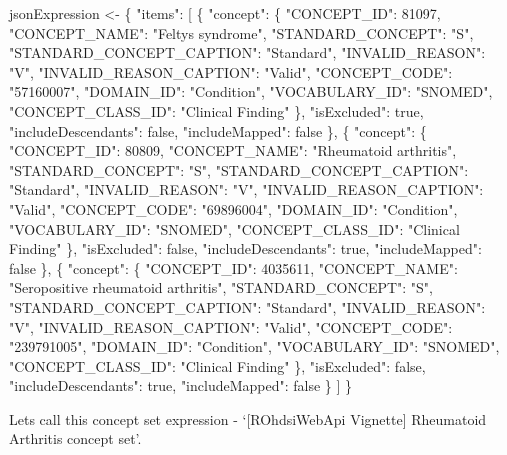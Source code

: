 \documentclass[
]{article}
\newenvironment{Shaded}{\begin{snugshade}}{\end{snugshade}}
\newcommand{\NormalTok}[1]{#1}
\newcommand{\StringTok}[1]{\textcolor[rgb]{0.31,0.60,0.02}{#1}}
\begin{document}
\begin{Shaded}
\begin{Highlighting}[]
\NormalTok{jsonExpression <{-}}\StringTok{ \textquotesingle{}\{}
\StringTok{  "items": [}
\StringTok{    \{}
\StringTok{      "concept": \{}
\StringTok{        "CONCEPT\_ID": 81097,}
\StringTok{        "CONCEPT\_NAME": "Feltys syndrome",}
\StringTok{        "STANDARD\_CONCEPT": "S",}
\StringTok{        "STANDARD\_CONCEPT\_CAPTION": "Standard",}
\StringTok{        "INVALID\_REASON": "V",}
\StringTok{        "INVALID\_REASON\_CAPTION": "Valid",}
\StringTok{        "CONCEPT\_CODE": "57160007",}
\StringTok{        "DOMAIN\_ID": "Condition",}
\StringTok{        "VOCABULARY\_ID": "SNOMED",}
\StringTok{        "CONCEPT\_CLASS\_ID": "Clinical Finding"}
\StringTok{      \},}
\StringTok{      "isExcluded": true,}
\StringTok{      "includeDescendants": false,}
\StringTok{      "includeMapped": false}
\StringTok{    \},}
\StringTok{    \{}
\StringTok{      "concept": \{}
\StringTok{        "CONCEPT\_ID": 80809,}
\StringTok{        "CONCEPT\_NAME": "Rheumatoid arthritis",}
\StringTok{        "STANDARD\_CONCEPT": "S",}
\StringTok{        "STANDARD\_CONCEPT\_CAPTION": "Standard",}
\StringTok{        "INVALID\_REASON": "V",}
\StringTok{        "INVALID\_REASON\_CAPTION": "Valid",}
\StringTok{        "CONCEPT\_CODE": "69896004",}
\StringTok{        "DOMAIN\_ID": "Condition",}
\StringTok{        "VOCABULARY\_ID": "SNOMED",}
\StringTok{        "CONCEPT\_CLASS\_ID": "Clinical Finding"}
\StringTok{      \},}
\StringTok{      "isExcluded": false,}
\StringTok{      "includeDescendants": true,}
\StringTok{      "includeMapped": false}
\StringTok{    \},}
\StringTok{    \{}
\StringTok{      "concept": \{}
\StringTok{        "CONCEPT\_ID": 4035611,}
\StringTok{        "CONCEPT\_NAME": "Seropositive rheumatoid arthritis",}
\StringTok{        "STANDARD\_CONCEPT": "S",}
\StringTok{        "STANDARD\_CONCEPT\_CAPTION": "Standard",}
\StringTok{        "INVALID\_REASON": "V",}
\StringTok{        "INVALID\_REASON\_CAPTION": "Valid",}
\StringTok{        "CONCEPT\_CODE": "239791005",}
\StringTok{        "DOMAIN\_ID": "Condition",}
\StringTok{        "VOCABULARY\_ID": "SNOMED",}
\StringTok{        "CONCEPT\_CLASS\_ID": "Clinical Finding"}
\StringTok{      \},}
\StringTok{      "isExcluded": false,}
\StringTok{      "includeDescendants": true,}
\StringTok{      "includeMapped": false}
\StringTok{    \}}
\StringTok{  ]}
\StringTok{\}\textquotesingle{}}
\end{Highlighting}
\end{Shaded}

Lets call this concept set expression - `{[}ROhdsiWebApi Vignette{]}
Rheumatoid Arthritis concept set'.
\end{document}
